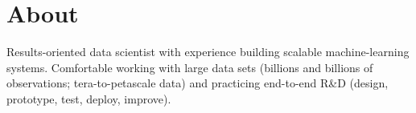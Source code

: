 \documentclass[print]{friggeri-cv} %
\begin{document}
\section{About}
Results-oriented data scientist with experience building scalable
machine-learning systems. Comfortable working
with large data sets (billions and billions of observations; tera-to-petascale
data) and practicing end-to-end R\&D (design, prototype, test, deploy,
improve).

\iftoggle{cv}
{\section{Research/Work Experience}
}
{\section{Selected Experience}
}
\end{document}
